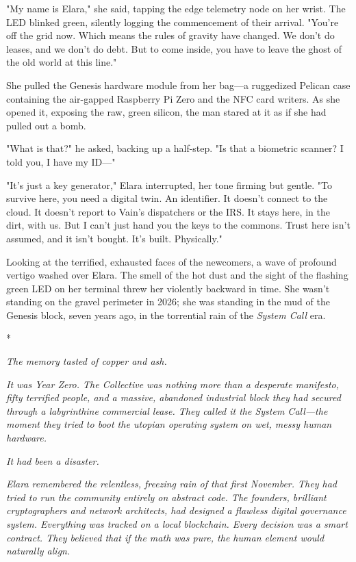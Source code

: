 "My name is Elara," she said, tapping the edge telemetry node on her wrist. The LED blinked green, silently logging the commencement of their arrival. "You’re off the grid now. Which means the rules of gravity have changed. We don't do leases, and we don't do debt. But to come inside, you have to leave the ghost of the old world at this line."

She pulled the Genesis hardware module from her bag—a ruggedized Pelican case containing the air-gapped Raspberry Pi Zero and the NFC card writers. As she opened it, exposing the raw, green silicon, the man stared at it as if she had pulled out a bomb. 

"What is that?" he asked, backing up a half-step. "Is that a biometric scanner? I told you, I have my ID—"

"It's just a key generator," Elara interrupted, her tone firming but gentle. "To survive here, you need a digital twin. An identifier. It doesn't connect to the cloud. It doesn't report to Vain's dispatchers or the IRS. It stays here, in the dirt, with us. But I can't just hand you the keys to the commons. Trust here isn't assumed, and it isn't bought. It's built. Physically."

Looking at the terrified, exhausted faces of the newcomers, a wave of profound vertigo washed over Elara. The smell of the hot dust and the sight of the flashing green LED on her terminal threw her violently backward in time. She wasn't standing on the gravel perimeter in 2026; she was standing in the mud of the Genesis block, seven years ago, in the torrential rain of the \textit{System Call} era.

\textit{}*

\textit{The memory tasted of copper and ash.}

\textit{It was Year Zero. The Collective was nothing more than a desperate manifesto, fifty terrified people, and a massive, abandoned industrial block they had secured through a labyrinthine commercial lease. They called it the System Call—the moment they tried to boot the utopian operating system on wet, messy human hardware.}

\textit{It had been a disaster.}

\textit{Elara remembered the relentless, freezing rain of that first November. They had tried to run the community entirely on abstract code. The founders, brilliant cryptographers and network architects, had designed a flawless digital governance system. Everything was tracked on a local blockchain. Every decision was a smart contract. They believed that if the math was pure, the human element would naturally align.}

